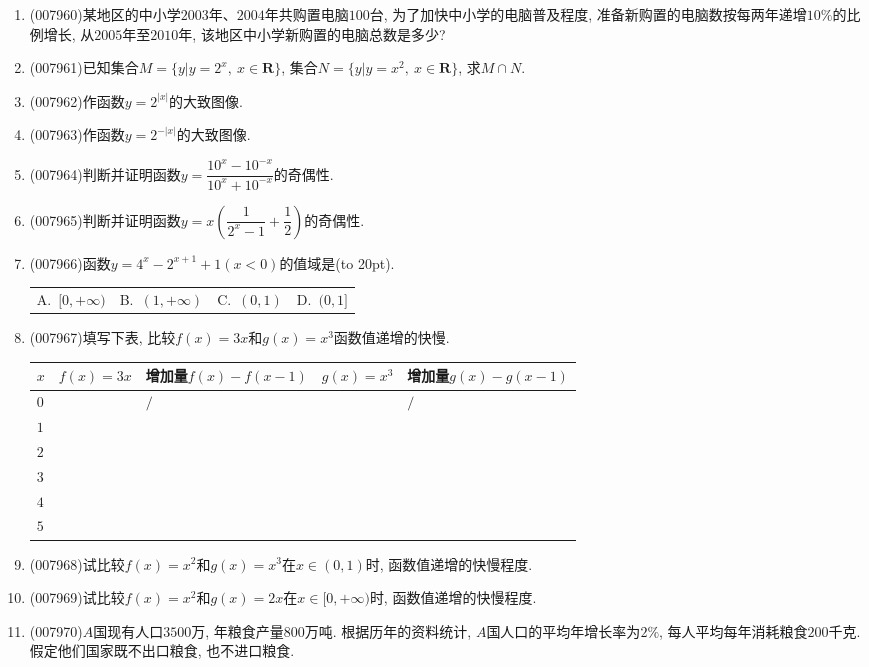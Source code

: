 \documentclass[10pt,a4paper]{article}
\newcommand{\bracket}[1]{(\hbox to #1pt{})}
\newcommand{\fourch}[4]{\par\begin{tabular}{p{.23\textwidth}p{.23\textwidth}p{.23\textwidth}p{.23\textwidth}}
A.~#1 &B.~#2& C.~#3& D.~#4
\end{tabular}}
\begin{document}
\begin{enumerate}[1.]
\fourch{$m\ge 1$}{$m<1$}{$m>-1$}{$m\le -1$}
\item {\tiny (007960)}某地区的中小学$2003$年、$2004$年共购置电脑$100$台, 为了加快中小学的电脑普及程度, 准备新购置的电脑数按每两年递增$10\%$的比例增长, 从$2005$年至$2010$年, 该地区中小学新购置的电脑总数是多少?
\item {\tiny (007961)}已知集合$M=\{y|y=2^x,\ x\in \mathbf{R}\}$, 集合$N=\{y|y=x^2,\ x\in \mathbf{R}\}$, 求$M\cap N$.
\item {\tiny (007962)}作函数$y=2^{|x|}$的大致图像.
\item {\tiny (007963)}作函数$y=2^{-|x|}$的大致图像.
\item {\tiny (007964)}判断并证明函数$y=\dfrac{10^x-10^{-x}}{10^x+10^{-x}}$的奇偶性.
\item {\tiny (007965)}判断并证明函数$y=x(\dfrac 1{2^x-1}+\dfrac 12)$的奇偶性.
\item {\tiny (007966)}函数$y=4^x-2^{x+1}+1(x<0)$的值域是\bracket{20}.
\fourch{$[0,+\infty)$}{$(1,+\infty)$}{$(0,1)$}{$(0,1]$}
\item {\tiny (007967)}填写下表, 比较$f(x)=3x$和$g(x)=x^3$函数值递增的快慢.
\begin{center}
    \begin{tabular}{|p{}<{\centering}|p{}<{\centering}|p{}<{\centering}|p{}<{\centering}|p{}<{\centering}|}
        \hline
        $x$ & $f(x)=3x$ & 增加量$f(x)-f(x-1)$ & $g(x)=x^3$ & 增加量$g(x)-g(x-1)$ \\ \hline
        $0$ & & $\slash$ & & $\slash$ \\ \hline
        $1$ & & & & \\ \hline
        $2$ & & & & \\ \hline
        $3$ & & & & \\ \hline
        $4$ & & & & \\ \hline
        $5$ & & & & \\ \hline
    \end{tabular}
\end{center}
\item {\tiny (007968)}试比较$f(x)=x^2$和$g(x)=x^3$在$x\in (0,1)$时, 函数值递增的快慢程度.
\item {\tiny (007969)}试比较$f(x)=x^2$和$g(x)=2x$在$x\in [0, +\infty)$时, 函数值递增的快慢程度.
\item {\tiny (007970)}$A$国现有人口$3500$万, 年粮食产量$800$万吨. 根据历年的资料统计, $A$国人口的平均年增长率为$2\%$, 每人平均每年消耗粮食$200$千克. 假定他们国家既不出口粮食, 也不进口粮食.\\

\end{enumerate}
\end{document}
